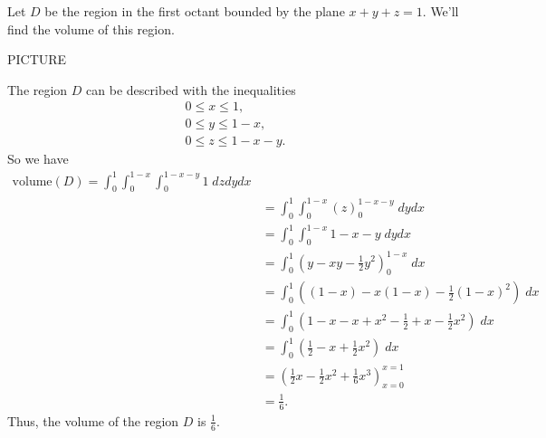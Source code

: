 \documentclass{ximera}
\begin{document}
\begin{example}
Let $D$ be the region in the first octant bounded by the plane $x+y+z=1$. We'll find the volume of this region.

PICTURE

The region $D$ can be described with the inequalities
\begin{align*}
0\leq x\leq 1,\\
0\leq y\leq 1-x,\\
0\leq z\leq 1-x-y.
\end{align*}
So we have
\begin{align*}
\text{volume}(D) = \int_0^1\int_0^{1-x}\int_0^{1-x-y} 1\;dzdydx\\
&= \int_0^1\int_0^{1-x}(z)_0^{1-x-y} \;dydx\\
&= \int_0^1\int_0^{1-x}1-x-y \;dydx\\
&= \int_0^1\left(y-xy-\frac{1}{2}y^2\right)_0^{1-x} \;dx\\
&= \int_0^1\left((1-x)-x(1-x)-\frac{1}{2}(1-x)^2\right) \;dx\\
&= \int_0^1\left(1-x-x+x^2-\frac{1}{2}+x-\frac{1}{2}x^2\right) \;dx\\
&= \int_0^1\left(\frac{1}{2}-x+\frac{1}{2}x^2\right) \;dx\\
&= \left(\frac{1}{2}x-\frac{1}{2}x^2+\frac{1}{6}x^3\right)_{x=0}^{x=1}\\
&= \frac{1}{6}.
\end{align*}
Thus, the volume of the region $D$ is $\frac{1}{6}$.
\end{example}
\end{document}
